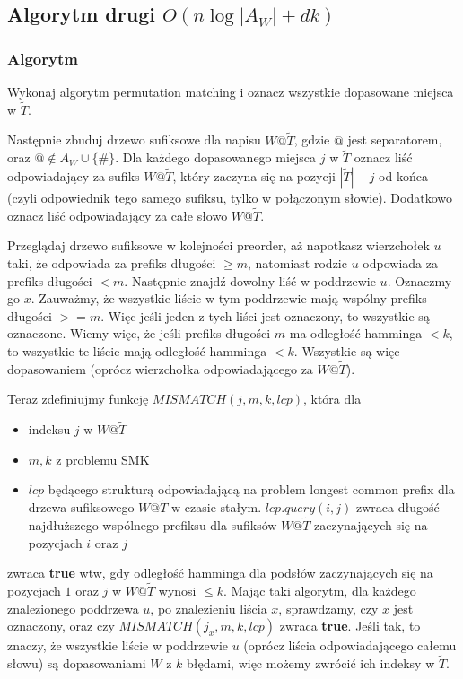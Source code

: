 \documentclass[a4paper,11pt]{article}
\begin{document}
\subsection{Algorytm drugi $O(n\log|A_W| +dk)$}
\subsubsection{Algorytm}
Wykonaj algorytm permutation matching i oznacz wszystkie dopasowane miejsca w $\tilde{T}$.
\par
Następnie zbuduj drzewo sufiksowe dla napisu $W@\tilde{T}$, gdzie $@$ jest separatorem, oraz $@\notin A_W\cup \{\#\}$. Dla każdego dopasowanego miejsca $j$ w $\tilde{T}$ oznacz liść odpowiadający za sufiks $W@\tilde{T}$, który zaczyna się na pozycji $|\tilde{T}|-j$ od końca (czyli odpowiednik tego samego sufiksu, tylko w połączonym słowie). Dodatkowo oznacz liść odpowiadający za całe słowo $W@\tilde{T}$.
\par
Przeglądaj drzewo sufiksowe w kolejności preorder, aż napotkasz wierzchołek $u$ taki, że odpowiada za prefiks długości $\geq m$, natomiast rodzic $u$ odpowiada za prefiks długości $< m$. Następnie znajdź dowolny liść w poddrzewie $u$. Oznaczmy go $x$. Zauważmy, że wszystkie liście w tym poddrzewie mają wspólny prefiks długości $>=m$. Więc jeśli jeden z tych liści jest oznaczony, to wszystkie są oznaczone. Wiemy więc, że jeśli prefiks długości $m$ ma odległość hamminga $<k$, to wszystkie te liście mają odległość hamminga $<k$. Wszystkie są więc dopasowaniem (oprócz wierzchołka odpowiadającego za $W@\tilde{T}$).
\par
Teraz zdefiniujmy funkcję $MISMATCH(j, m, k, lcp)$, która dla
\begin{itemize}
    \item indeksu $j$ w $W@\tilde{T}$
    \item $m,k$ z problemu SMK
    \item $lcp$ będącego strukturą odpowiadającą na problem longest common prefix dla drzewa sufiksowego $W@\tilde{T}$ w czasie stałym. $lcp.query(i,j)$ zwraca długość najdłuższego wspólnego prefiksu dla sufiksów $W@\tilde{T}$ zaczynających się na pozycjach $i$ oraz $j$
\end{itemize}
zwraca \textbf{true} wtw, gdy odległość hamminga dla podsłów zaczynających się na pozycjach $1$ oraz $j$ w $W@\tilde{T}$ wynosi $\leq k$. Mając taki algorytm, dla każdego znalezionego poddrzewa $u$, po znalezieniu liścia $x$, sprawdzamy, czy $x$ jest oznaczony, oraz czy $MISMATCH(j_x,m,k,lcp)$ zwraca \textbf{true}. Jeśli tak, to znaczy, że wszystkie liście w poddrzewie $u$ (oprócz liścia odpowiadającego całemu słowu) są dopasowaniami $W$ z $k$ błędami, więc możemy zwrócić ich indeksy w $\tilde{T}$.
\end{document}
